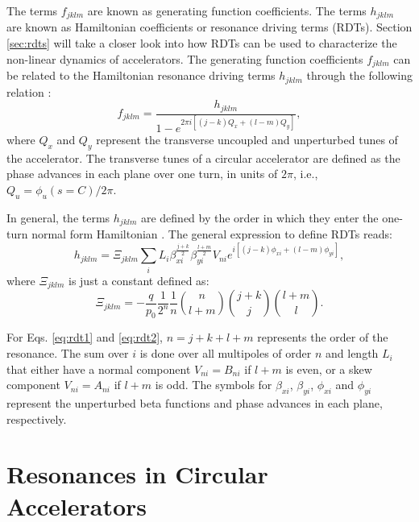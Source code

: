 The terms $f_{jklm}$ are known as generating function coefficients. The terms $h_{jklm}$ are known as Hamiltonian coefficients or resonance driving terms (RDTs). Section \ref{sec:rdts} will take a closer look into how RDTs can be used to characterize the non-linear dynamics of accelerators. The generating function coefficients $f_{jklm}$ can be related to the Hamiltonian resonance driving terms $h_{jklm}$ through the following relation \cite{cernthesis1,bartolini}:
\begin{equation}
    \label{eq:handf}
    f_{jklm}=\frac{h_{jklm}}{1-e^{2\pi i \left[ \left( j-k \right) Q_x + \left( l-m\right) Q_y \right] }},
\end{equation}
where $Q_x$ and $Q_y$ represent the transverse uncoupled and unperturbed tunes of the accelerator. The transverse tunes of a circular accelerator are defined as the phase advances in each plane over one turn, in units of $2\pi$, i.e., $Q_u=\phi_u(s=C)/2\pi$. 

In general, the terms $h_{jklm}$ are defined by the order in which they enter the one-turn normal form Hamiltonian \cite{bartolini}. The general expression to define RDTs reads:
\begin{equation}
    \label{eq:rdt1}
    h_{jklm}=\Xi _{jklm} \sum_i L_i \beta_{xi}^{\frac{j+k}{2}} \beta_{yi}^{\frac{l+m}{2}} V_{ni}e^{i\left[ (j-k)\phi_{xi} +(l-m) \phi_{yi} \right]},
\end{equation}
where $\Xi _{jklm}$ is just a constant defined as:
\begin{equation}
    \label{eq:rdt2}
    \Xi _{jklm} = -\frac{q}{p_0}\frac{1}{2^n}\frac{1}{n} {\binom{n}{l+m}} {\binom{j+k}{j}}{\binom{l+m}{l}}.
\end{equation}

For Eqs. \ref{eq:rdt1} and \ref{eq:rdt2}, $n=j+k+l+m$ represents the order of the resonance. The sum over $i$ is done over all multipoles of order $n$ and length $L_i$ that either have a normal component $V_{ni}=B_{ni}$ if $l+m$ is even, or a skew component $V_{ni}=A_{ni}$ if $l+m$ is odd. The symbols for $\beta_{xi}$, $\beta_{yi}$, $\phi_{xi}$ and $\phi_{yi}$ represent the unperturbed beta functions and phase advances in each plane, respectively.

\section{\label{sec:resonances}Resonances in Circular Accelerators}

